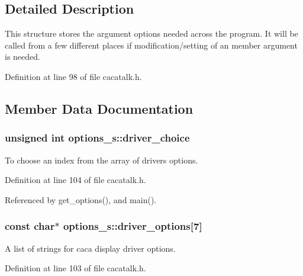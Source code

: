 \subsection{\-Detailed \-Description}
\-This structure stores the argument options needed across the program. \-It will be called from a few different places if modification/setting of an member argument is needed. 

\-Definition at line 98 of file cacatalk.\-h.



\subsection{\-Member \-Data \-Documentation}
\hypertarget{structoptions__s_a23c963605bc84d66eedd18089502d8e4}{
\subsubsection[{driver\-\_\-choice}]{\setlength{\rightskip}{0pt plus 5cm}unsigned int {\bf options\-\_\-s\-::driver\-\_\-choice}}}\label{structoptions__s_a23c963605bc84d66eedd18089502d8e4}


\-To choose an index from the array of drivers options. 



\-Definition at line 104 of file cacatalk.\-h.



\-Referenced by get\-\_\-options(), and main().

\hypertarget{structoptions__s_a74d98a4b0f31c22e05993a1bdef76afc}{
\subsubsection[{driver\-\_\-options}]{\setlength{\rightskip}{0pt plus 5cm}const char$\ast$ {\bf options\-\_\-s\-::driver\-\_\-options}\mbox{[}7\mbox{]}}}\label{structoptions__s_a74d98a4b0f31c22e05993a1bdef76afc}


\-A list of strings for caca display driver options. 



\-Definition at line 103 of file cacatalk.\-h.



